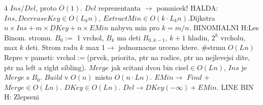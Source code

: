 \documentclass[8pt]{extarticle}
\begin{document}
\begin{multicols*}{4}
$Ins/Del$, proto $\overline{O}(1)$. $Del$ reprezentanta $\rightarrow$ pomnicek! HALDA:$Ins,DecreaseKey\in O(L_{k}n)$, $ExtractMin\in O(k\cdot L_{k}n)$.Dijkstra $n\times Ins + m\times DKey +n \times EMin$ nabyva min pro $k=m/n$. BINOMIALNI H:Les Binom. stromu. $B_0 :=$ 1 vrchol, $B_k$ ma deti $B_{0..k-1}$, $k+1$ hladin, $2^k$ vrcholu, max $k$ deti. Strom radu $k$ max 1$\rightarrow$ jednoznacne urceno ktere. $\#$strmu $O(Ln)$ Repre v pameti: vrchol$:=$(prvek, priorita, ptr na rodice, ptr na nejlevejsi dite, ptr na left a right sibling). $Merge$ jak scitani dvou bin cisel$\in O(Ln)$, $Ins$ je $Merge$ s $B_0$. $Build$ v $O(n)$ misto $O(n\cdot Ln)$. $EMin\rightarrow$ $Find$ + $Merge \in O(Ln)$. $DKey \in O(Ln)$. $Del\rightarrow DKey(-\infty) + EMin$. LINE BIN H: Zlepseni 

\end{multicols*}
\end{document}
